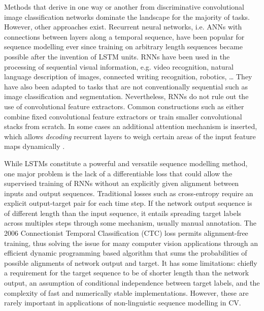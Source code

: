 Methods that derive in one way or another from discriminative convolutional
image classification networks dominate the landscape for the majority of tasks.
However, other approaches exist. Recurrent neural networks, i.e. ANNs with
connections between layers along a temporal sequence, have been popular for
sequence modelling ever since training on arbitrary length sequences became
possible after the invention of LSTM units. RNNs have been used in the
processing of sequential visual information, e.g. video recognition, natural
language description of images, connected writing recognition, robotics, \dots
They have also been adapted to tasks that are not conventionally sequential
such as image classification \cite{visin2015renet} and
\cite{stollenga2015parallel} segmentation. Nevertheless, RNNs do not rule out
the use of convolutional feature extractors. Common constructions such as
\cite{shi2016end} either combine fixed convolutional feature extractors or
train smaller convolutional stacks from scratch. In some cases an additional
attention mechanism is inserted, which allows \emph{decoding} recurrent layers
to weigh certain areas of the input feature maps dynamically \cite{xu2015show}.

While LSTMs constitute a powerful and versatile sequence modelling method, one
major problem is the lack of a differentiable loss that could allow the
supervised training of RNNs without an explicitly given alignment between
inputs and output sequences. Traditional losses such as cross-entropy require
an explicit output-target pair for each time step. If the network output
sequence is of different length than the input sequence, it entails spreading
target labels across multiples steps through some mechanism, usually manual
annotation. The 2006 Connectionist Temporal Classification (CTC) loss
\cite{graves2006connectionist} permits alignment-free training, thus solving
the issue for many computer vision applications through an efficient dynamic
programming based algorithm that sums the probabilities of possible alignments
of network output and target. It has some limitations: chiefly a requirement
for the target sequence to be of shorter length than the network output, an
assumption of conditional independence between target labels, and the
complexity of fast and numerically stable implementations. However, these are
rarely important in applications of non-linguistic sequence modelling in CV. 


